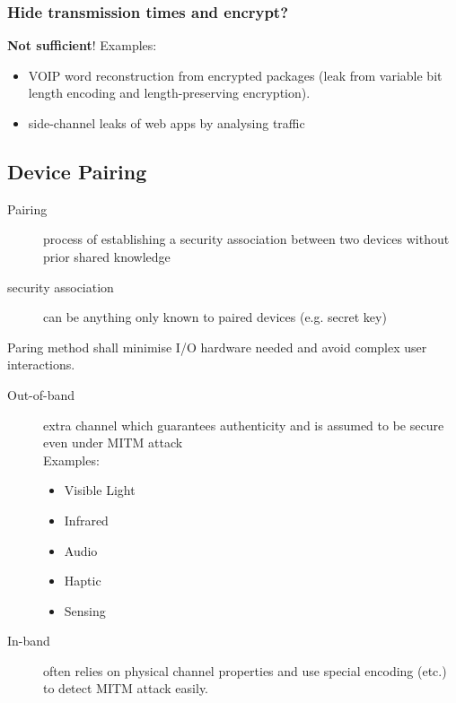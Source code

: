\subsubsection{Hide transmission times and encrypt?}
\textbf{Not sufficient}! Examples:
\begin{itemize}
    \item VOIP word reconstruction from encrypted packages (leak from variable bit length encoding and length-preserving encryption).
    \item side-channel leaks of web apps by analysing traffic
\end{itemize}

\subsection{Device Pairing}
\begin{description}
    \item[Pairing] process of establishing a security association between two devices without prior shared knowledge
    \item[security association] can be anything only known to paired devices (e.g. secret key)
\end{description}

Paring method shall minimise I/O hardware needed and avoid complex user interactions.

\begin{description}
    \item[Out-of-band] extra channel which guarantees authenticity and is
      assumed to be secure even under MITM attack \hfill\\
      Examples:
      \begin{itemize}
      	\item Visible Light
	\item Infrared
	\item Audio
	\item Haptic
	\item Sensing
      \end{itemize}
    \item[In-band] often relies on physical channel properties and use special encoding (etc.) to detect MITM attack easily.
\end{description}

